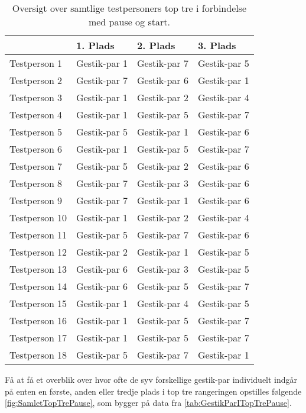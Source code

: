 \begin{table}[H]
	\centering
	\begin{tabular}{ | p{3cm} | p{3cm} | p{3cm} | p{3cm} |}
	\hline
		 & 1. Plads & 2. Plads & 3. Plads \\ \hline
		Testperson 1 & Gestik-par 1 & Gestik-par 7 & Gestik-par 5 \\ \hline
		Testperson 2 & Gestik-par 7 & Gestik-par 6 & Gestik-par 1 \\ \hline
		Testperson 3 & Gestik-par 1 & Gestik-par 2 & Gestik-par 4 \\ \hline
		Testperson 4 & Gestik-par 1 & Gestik-par 5 & Gestik-par 7 \\ \hline
		Testperson 5 & Gestik-par 5 & Gestik-par 1 & Gestik-par 6 \\ \hline
		Testperson 6 & Gestik-par 1 & Gestik-par 5 & Gestik-par 7 \\ \hline 
		Testperson 7 & Gestik-par 5 & Gestik-par 2 & Gestik-par 6 \\ \hline
		Testperson 8 & Gestik-par 7 & Gestik-par 3 & Gestik-par 6 \\ \hline
		Testperson 9 & Gestik-par 7 & Gestik-par 1 & Gestik-par 6 \\ \hline
		Testperson 10 & Gestik-par 1 & Gestik-par 2 & Gestik-par 4 \\ \hline
		Testperson 11 & Gestik-par 5 & Gestik-par 7 & Gestik-par 6 \\ \hline
		Testperson 12 & Gestik-par 2 & Gestik-par 1 & Gestik-par 5 \\ \hline
		Testperson 13 & Gestik-par 6 & Gestik-par 3 & Gestik-par 5 \\ \hline
		Testperson 14 & Gestik-par 6 & Gestik-par 5 & Gestik-par 7 \\ \hline
		Testperson 15 & Gestik-par 1 & Gestik-par 4 & Gestik-par 5 \\ \hline
		Testperson 16 & Gestik-par 1 & Gestik-par 5 & Gestik-par 7 \\ \hline
		Testperson 17 & Gestik-par 1 & Gestik-par 5 & Gestik-par 7 \\ \hline
		Testperson 18 & Gestik-par 5 & Gestik-par 7 & Gestik-par 1 \\ \hline
	\end{tabular}
	\caption{Oversigt over samtlige testpersoners top tre i forbindelse med pause og start.}
	\label{tab:GestikParITopTrePause}
\end{table}
\noindent
%
Få at få et overblik over hvor ofte de syv forskellige gestik-par individuelt indgår på enten en første, anden eller tredje plads i top tre rangeringen opstilles følgende \autoref{fig:SamletTopTrePause}, som bygger på data fra \autoref{tab:GestikParITopTrePause}. 
